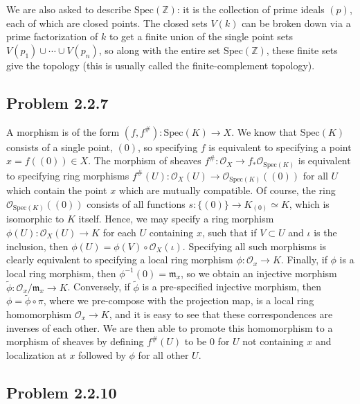 \documentclass[aps,pra,showpacs,notitlepage,onecolumn,superscriptaddress,nofootinbib]{revtex4-1}
\theoremstyle{definition}
\begin{document}
  We are also asked to describe $\text{Spec}(\mathbb{Z})$: it is the collection of prime ideals $(p)$, each of which are closed points. The closed sets $V(k)$ can be broken down via a prime factorization of $k$
  to get a finite union of the single point sets $V(p_1) \cup \cdots \cup V(p_n)$, so along with the entire set $\text{Spec}(\mathbb{Z})$, these finite sets give the topology (this is usually called the finite-complement topology).

  \subsection{Problem 2.2.7}

 \noindent A morphism is of the form $(f, f^{\#}) : \text{Spec}(K) \rightarrow X$. We know that $\text{Spec}(K)$ consists of a single point, $(0)$, so specifying $f$ is equivalent to specifying a point $x = f((0)) \in X$.
  The morphism of sheaves $f^{\#} : \mathcal{O}_X \rightarrow f_{*} \mathcal{O}_{\text{Spec}(K)}$ is equivalent to specifying ring morphisms $f^{\#}(U) : \mathcal{O}_X(U) \rightarrow \mathcal{O}_{\text{Spec}(K)}((0))$
  for all $U$ which contain the point $x$ which are mutually compatible. Of course, the ring $\mathcal{O}_{\text{Spec}(K)}((0))$ consists of all functions $s : \{(0)\} \rightarrow K_{(0)} \simeq K$, which is isomorphic to $K$ itself. Hence,
  we may specify a ring morphism $\phi(U) : \mathcal{O}_X(U) \rightarrow K$ for each $U$ containing $x$, such that if $V \subset U$ and $\iota$ is the inclusion, then $\phi(U) = \phi(V) \circ \mathcal{O}_X(\iota)$.
  Specifying all such morphisms is clearly equivalent to specifying a local ring morphism $\phi : \mathcal{O}_{x} \rightarrow K$. Finally, if $\phi$ is a local ring morphism, then $\phi^{-1}(0) = \mathfrak{m}_x$, so
  we obtain an injective morphism $\widetilde{\phi} : \mathcal{O}_x/\mathfrak{m}_x \rightarrow K$. Conversely, if $\widetilde{\phi}$ is a pre-specified injective morphism, then $\phi = \widetilde{\phi} \circ \pi$,
  where we pre-compose with the projection map, is a local ring homomorphism $\mathcal{O}_x \rightarrow K$, and it is easy to see that these correspondences are inverses of each other. We are then
  able to promote this homomorphism to a morphism of sheaves by defining $f^{\#}(U)$ to be $0$ for $U$ not containing $x$ and localization at $x$ followed by $\phi$ for all other $U$.

\subsection{Problem 2.2.10}
\end{document}
